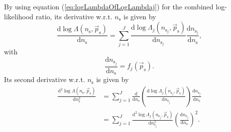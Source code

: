 \documentclass{article}
\newcommand{\ns}{n_{\mathrm{s}}}
\newcommand{\ps}{\vec{p}_{\mathrm{s}}}
\begin{document}
By using equation (\ref{eq:logLambdaOfLogLambdaj}) for the combined log-likelihood
ratio, its derivative w.r.t. $\ns$ is given by
\begin{equation}
 \frac{\mathrm{d}\log\Lambda(\ns,\ps)}{\mathrm{d}\ns} = \sum_{j=1}^{J} \frac{\mathrm{d}\log\Lambda_j(n_{\mathrm{s}_j},\ps)}{\mathrm{d}n_{\mathrm{s}_j}} \frac{\mathrm{d} n_{\mathrm{s}_j}}{\mathrm{d} \ns},
\end{equation}
with
\begin{equation}
\frac{\mathrm{d} n_{\mathrm{s}_j}}{\mathrm{d} \ns} = f_j(\ps).
\end{equation}
Its second derivative w.r.t. $\ns$ is given by
\begin{align}
 \frac{\mathrm{d}^2\log\Lambda(\ns,\ps)}{\mathrm{d}\ns^2} &= \sum_{j=1}^{J} \frac{\mathrm{d}}{\mathrm{d}\ns}\left( \frac{\mathrm{d}\log\Lambda_j(n_{\mathrm{s}_j},\ps)}{\mathrm{d}n_{\mathrm{s}_j}} \right) \frac{\mathrm{d} n_{\mathrm{s}_j}}{\mathrm{d} \ns}\\
							  &= \sum_{j=1}^{J} \frac{\mathrm{d}^2\log\Lambda_j(n_{\mathrm{s}_j},\ps)}{\mathrm{d}n_{\mathrm{s}_j}^2} \left( \frac{\mathrm{d} n_{\mathrm{s}_j}}{\mathrm{d} \ns} \right)^2.
\end{align}
\end{document}
